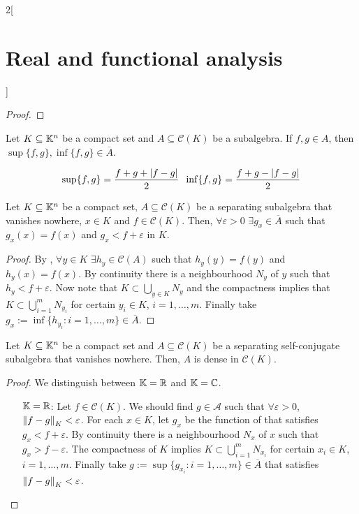 \documentclass[../../../main_math.tex]{subfiles}
\begin{document}
\begin{multicols}{2}[\section{Real and functional analysis}]
\begin{proof}
  \end{proof}
  \begin{corollary}
    Let $K\subseteq \mathbb{K}^n$ be a compact set and $A\subseteq \mathcal{C}(K)$ be a subalgebra. If $f,g\in A$, then $\sup\{f,g\}, \inf\{f,g\}\in \overline{A}$.
  \end{corollary}
  \begin{sproof}
    $$\sup\{f,g\}=\frac{f+g+\abs{f-g}}{2}\;\;\inf\{f,g\}=\frac{f+g-\abs{f-g}}{2}$$
  \end{sproof}
  \begin{lemma}\label{RFA:lemmaStone}
    Let $K\subseteq \mathbb{K}^n$ be a compact set, $A\subseteq \mathcal{C}(K)$ be a separating subalgebra that vanishes nowhere, $x\in K$ and $f\in\mathcal{C}(K)$. Then, $\forall \varepsilon>0$ $\exists g_x\in\overline{A}$ such that $g_x(x)=f(x)$ and $g_x<f+\varepsilon$ in $K$.
  \end{lemma}
  \begin{proof}
    By , $\forall y\in K$ $\exists h_y\in\mathcal{C}(A)$ such that $h_y(y)=f(y)$ and $h_y(x)=f(x)$. By continuity there is a neighbourhood $N_y$ of $y$ such that $h_y<f+\varepsilon$. Now note that $K\subset\bigcup_{y\in K}N_y$ and the compactness implies that $K\subset\bigcup_{i=1}^mN_{y_i}$ for certain $y_i\in K$, $i=1,\ldots,m$. Finally take $g_x:=\inf\{h_{y_i}:i=1,\ldots,m\}\in\overline{A}$.
  \end{proof}
  \begin{important}
    \begin{theorem}
      Let $K\subseteq \mathbb{K}^n$ be a compact set and $A\subseteq \mathcal{C}(K)$ be a separating self-conjugate subalgebra that vanishes nowhere. Then, $A$ is dense in $\mathcal{C}(K)$.
    \end{theorem}
  \end{important}
  \begin{proof}
    We distinguish between $\mathbb{K}=\mathbb{R}$ and $\mathbb{K}=\mathbb{C}$.
    \begin{itemize}[leftmargin=1.3cm]
      \item[$\mathbb{K}=\mathbb{R}$:] Let $f\in\mathcal{C}(K)$. We should find $g\in\mathcal{A}$ such that $\forall \varepsilon>0$, $\left\|f-g\right\|_K<\varepsilon$. For each $x\in K$, let $g_x$ be the function of  that satisfies $g_x<f+\varepsilon$. By continuity there is a neighbourhood $N_x$ of $x$ such that $g_x>f-\varepsilon$. The compactness of $K$ implies $K\subset\bigcup_{i=1}^mN_{x_i}$ for certain $x_i\in K$, $i=1,\ldots,m$. Finally take $g:=\sup\{g_{x_i}:i=1,\ldots,m\}\in\overline{A}$ that satisfies $\left\|f-g\right\|_K<\varepsilon$.

\end{itemize}
\end{proof}
\end{multicols}
\end{document}
